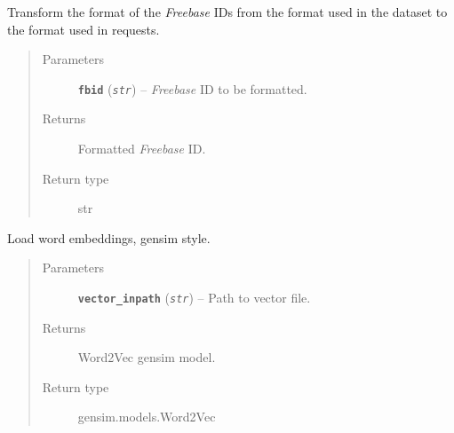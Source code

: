 \documentclass[letterpaper,10pt,english]{sphinxmanual}
\begin{document}

\begin{fulllineitems}
\label{src.misc:src.misc.helpers.format_fbid}
Transform the format of the \emph{Freebase} IDs from the format used in the dataset to the format used in requests.
\begin{quote}\begin{description}
\item[{Parameters}] \leavevmode
\textbf{\texttt{fbid}} (\emph{\texttt{str}}) -- \emph{Freebase} ID to be formatted.

\item[{Returns}] \leavevmode
Formatted \emph{Freebase} ID.

\item[{Return type}] \leavevmode
str

\end{description}\end{quote}

\end{fulllineitems}


\begin{fulllineitems}
\label{src.misc:src.misc.helpers.load_vectors}
Load word embeddings, gensim style.
\begin{quote}\begin{description}
\item[{Parameters}] \leavevmode
\textbf{\texttt{vector\_inpath}} (\emph{\texttt{str}}) -- Path to vector file.

\item[{Returns}] \leavevmode
Word2Vec gensim model.

\item[{Return type}] \leavevmode
gensim.models.Word2Vec

\end{description}\end{quote}

\end{fulllineitems}

\end{document}
